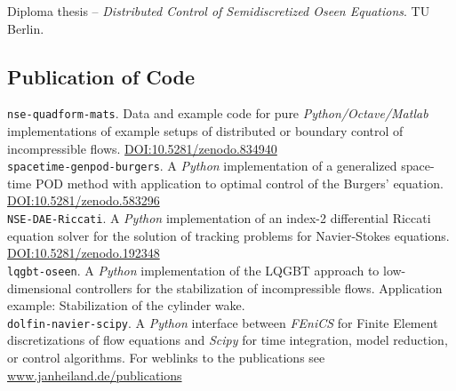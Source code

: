 \documentclass[11pt, a4paper]{article} %
\newcommand{\years}[1]{\marginnote{\scriptsize #1}} %
\begin{document}
\years{2009} Diploma thesis -- \emph{Distributed Control of Semidiscretized Oseen Equations}. TU Berlin.

\vspace{.1in}
\subsection*{Publication of Code}

\years{2017}\texttt{nse-quadform-mats}. Data and example code for pure \emph{Python/Octave/Matlab} implementations of example setups of distributed or boundary control of incompressible flows. \href{https://doi.org/10.5281/zenodo.834940}{DOI:10.5281/zenodo.834940} \\

\years{2017}\texttt{spacetime-genpod-burgers}. A \emph{Python} implementation of a generalized space-time POD method with application to optimal control of the Burgers' equation. \\ \href{http://doi.org/10.5281/zenodo.583296}{DOI:10.5281/zenodo.583296}\\

\years{2016}\texttt{NSE-DAE-Riccati}. A \emph{Python} implementation of an index-2 differential Riccati equation solver for the solution of tracking problems for Navier-Stokes equations. \\ \href{http://doi.org/10.5281/zenodo.192348}{DOI:10.5281/zenodo.192348}\\

\years{2014}\texttt{lqgbt-oseen}. A \emph{Python} implementation of the LQGBT approach to low-dimensional controllers for the stabilization of incompressible flows. Application example: Stabilization of the cylinder wake.\\

\years{2014}\texttt{dolfin-navier-scipy}. A \emph{Python} interface between \emph{FEniCS} for Finite Element discretizations of flow equations and \emph{Scipy} for time integration, model reduction, or control algorithms.
\vfill
For weblinks to the publications see \href{http://www.janheiland.de/publications}{www.janheiland.de/publications}



% 
% 
% 
\end{document}

